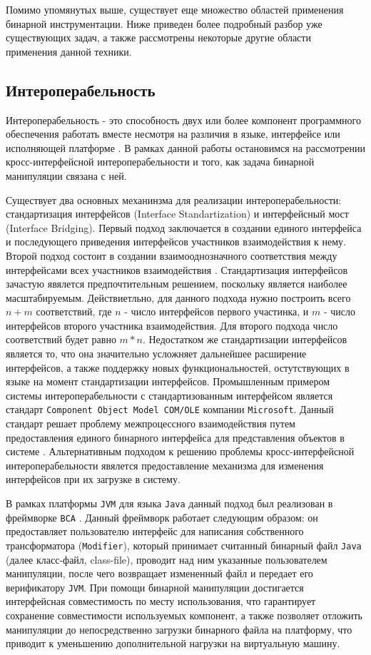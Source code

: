 Помимо упомянутых выше, существует еще множество областей применения бинарной инструментации. Ниже приведен более подробный разбор уже существующих задач, а также рассмотрены некоторые другие области применения данной техники.

\subsection{Интероперабельность}

Интероперабельность - это способность двух или более компонент программного обеспечения работать вместе несмотря на различия в языке, интерфейсе или исполняющей платформе \cite{malone2014}. В рамках данной работы остановимся на рассмотрении кросс-интерфейсной интероперабельности и того, как задача бинарной манипуляции связана с ней.

Существует два основных механинзма для реализации интероперабельности: стандартизация интерфейсов (Interface Standartization) и интерфейсный мост (Interface Bridging). Первый подход заключается в создании единого интерфейса и последующего приведения интерфейсов участников взаимодействия к нему. Второй подход состоит в создании взаимооднозначного соответствия между интерфейсами всех участников взаимодействия \cite{wegner1996}. Стандартизация интерфейсов зачастую явялется предпочтительным решением, поскольку является наиболее масштабируемым. Действиетльно, для данного подхода нужно построить всего $n + m$ соответствий, где $n$ - число интерфейсов первого участинка, и $m$ - число интерфейсов второго участника взаимодействия. Для второго подхода число соответствий будет равно $m * n$. Недостатком же стандартизации интерфейсов является то, что она значительно усложняет дальнейшее расширение интерфейсов, а также поддержку новых функциональностей, остутствующих в языке на момент стандартизации интерфейсов. Промышленным примером системы интероперабельности с стандартизованным интерфейсом является стандарт \texttt{Component~Object~Model~COM/OLE} компании \texttt{Microsoft}. Данный стандарт решает проблему межпроцессного взаимодействия путем предоставления единого бинарного интерфейса для представления объектов в системе \cite{brockschmidt1995}. Альтернативным подходом к решению проблемы кросс-интерфейсной интероперабельности явялется предоставление механизма для изменения интерфейсов при их загрузке в систему.

В рамках платформы \texttt{JVM} для языка \texttt{Java} данный подход был реализован в фреймворке \texttt{BCA} \cite{bca}. Данный фреймворк работает следующим образом: он предоставляет пользователю интерфейс для написания собственного трансформатора (\texttt{Modifier}), который принимает считанный бинарный файл \texttt{Java} (далее класс-файл, class-file), проводит над ним указанные пользователем манипуляции, после чего возвращает измененный файл и передает его верификатору \texttt{JVM}. При помощи бинарной манипуляции достигается интерфейсная совместимость по месту использования, что гарантирует сохранение совместимости используемых компонент, а также позволяет отложить манипуляции до непосредственно загрузки бинарного файла на платформу, что приводит к уменьшению дополнительной нагрузки на виртуальную машину.

